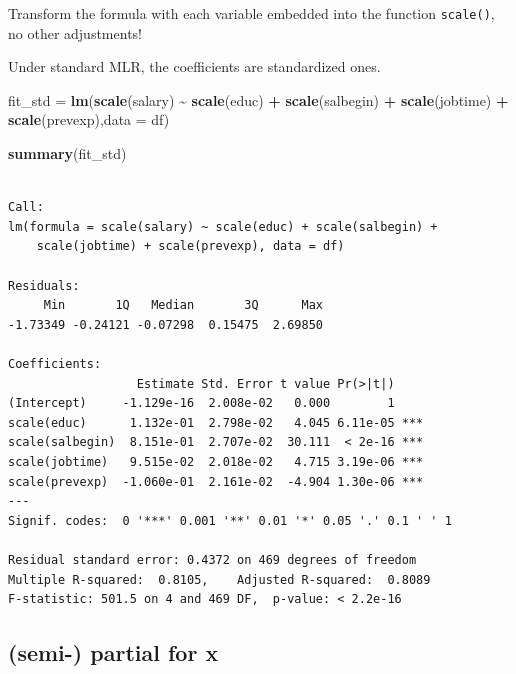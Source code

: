 \documentclass[
]{ctexart}
\newenvironment{Shaded}{\begin{snugshade}}{\end{snugshade}}
\newcommand{\AttributeTok}[1]{\textcolor[rgb]{0.13,0.29,0.53}{#1}}
\newcommand{\FunctionTok}[1]{\textcolor[rgb]{0.13,0.29,0.53}{\textbf{#1}}}
\newcommand{\NormalTok}[1]{#1}
\newcommand{\OtherTok}[1]{\textcolor[rgb]{0.56,0.35,0.01}{#1}}
\newcommand{\SpecialCharTok}[1]{\textcolor[rgb]{0.81,0.36,0.00}{\textbf{#1}}}
\begin{document}
Transform the formula with each variable embedded into the function
\texttt{scale()}, no other adjustments!

Under standard MLR, the coefficients are standardized ones.

\begin{Shaded}
\begin{Highlighting}[]
\NormalTok{fit\_std }\OtherTok{=} \FunctionTok{lm}\NormalTok{(}\FunctionTok{scale}\NormalTok{(salary) }\SpecialCharTok{\textasciitilde{}} \FunctionTok{scale}\NormalTok{(educ) }\SpecialCharTok{+} \FunctionTok{scale}\NormalTok{(salbegin) }\SpecialCharTok{+} \FunctionTok{scale}\NormalTok{(jobtime) }\SpecialCharTok{+} \FunctionTok{scale}\NormalTok{(prevexp),}\AttributeTok{data =}\NormalTok{ df)}
\end{Highlighting}
\end{Shaded}

\begin{Shaded}
\begin{Highlighting}[]
\FunctionTok{summary}\NormalTok{(fit\_std)}
\end{Highlighting}
\end{Shaded}

\begin{verbatim}

Call:
lm(formula = scale(salary) ~ scale(educ) + scale(salbegin) + 
    scale(jobtime) + scale(prevexp), data = df)

Residuals:
     Min       1Q   Median       3Q      Max 
-1.73349 -0.24121 -0.07298  0.15475  2.69850 

Coefficients:
                  Estimate Std. Error t value Pr(>|t|)    
(Intercept)     -1.129e-16  2.008e-02   0.000        1    
scale(educ)      1.132e-01  2.798e-02   4.045 6.11e-05 ***
scale(salbegin)  8.151e-01  2.707e-02  30.111  < 2e-16 ***
scale(jobtime)   9.515e-02  2.018e-02   4.715 3.19e-06 ***
scale(prevexp)  -1.060e-01  2.161e-02  -4.904 1.30e-06 ***
---
Signif. codes:  0 '***' 0.001 '**' 0.01 '*' 0.05 '.' 0.1 ' ' 1

Residual standard error: 0.4372 on 469 degrees of freedom
Multiple R-squared:  0.8105,    Adjusted R-squared:  0.8089 
F-statistic: 501.5 on 4 and 469 DF,  p-value: < 2.2e-16
\end{verbatim}

\hypertarget{semi--partial-for-x}{%
\subsection{(semi-) partial for x}\label{semi--partial-for-x}}
\end{document}
